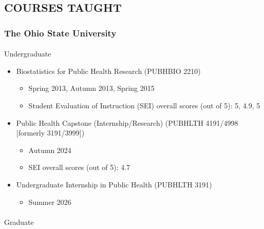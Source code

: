 \documentclass[
  english,
  letterpaper,
  DIV=11,
  numbers=noendperiod]{scrartcl}
\makeatletter
\let\oldparagraph\paragraph
\renewcommand{\paragraph}{
    \@ifstar
      \xxxParagraphStar
      \xxxParagraphNoStar
  }
\newcommand{\xxxParagraphStar}[1]{\oldparagraph*{#1}\mbox{}}
\newcommand{\xxxParagraphNoStar}[1]{\oldparagraph{#1}\mbox{}}
\providecommand{\tightlist}{%
  \setlength{\itemsep}{0pt}\setlength{\parskip}{0pt}}
\makeatother
\begin{document}
\subsection{COURSES TAUGHT}\label{courses-taught}

\subsubsection{The Ohio State
University}\label{the-ohio-state-university}

\paragraph{Undergraduate}\label{undergraduate}

\begin{itemize}
\tightlist
\item
  Biostatistics for Public Health Research (PUBHBIO 2210)

  \begin{itemize}
  \tightlist
  \item
    Spring 2013, Autumn 2013, Spring 2015
  \item
    Student Evaluation of Instruction (SEI) overall scores (out of 5):
    5, 4.9, 5
  \end{itemize}
\item
  Public Health Capstone (Internship/Research) (PUBHLTH 4191/4998
  {[}formerly 3191/3999{]})

  \begin{itemize}
  \tightlist
  \item
    Autumn 2024
  \item
    SEI overall scores (out of 5): 4.7
  \end{itemize}
\item
  Undergraduate Internship in Public Health (PUBHLTH 3191)

  \begin{itemize}
  \tightlist
  \item
    Summer 2026
  \end{itemize}
\end{itemize}

\paragraph{Graduate}\label{graduate}
\end{document}
